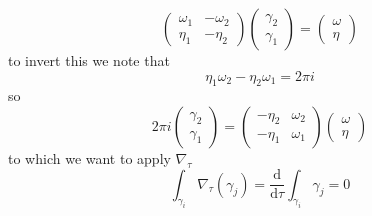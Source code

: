 \begin{frame}
    $$
    \left(\begin{array}{cc}
            \omega_{1} & -\omega_{2} \\
            \eta_{1} & -\eta_{2}
            \end{array}\right)\left(\begin{array}{l}
            \gamma_{2} \\
            \gamma_{1}
            \end{array}\right)=\left(\begin{array}{l}
            \omega \\
            \eta
    \end{array}\right)
    $$
    to invert this we note that
    $$
    \eta_{1} \omega_{2}-\eta_{2} \omega_{1}=2 \pi i
    $$
    so
    $$
    2 \pi i\left(\begin{array}{l}
            \gamma_{2} \\
            \gamma_{1}
            \end{array}\right)=\left(\begin{array}{ll}
            -\eta_{2} & \omega_{2} \\
            -\eta_{1} & \omega_{1}
            \end{array}\right)\left(\begin{array}{l}
            \omega \\
            \eta
    \end{array}\right)
    $$
    to which we want to apply $\nabla_\tau$
    $$
    \int_{{\gamma}_{{i}}} \nabla_{{\tau}}(\gamma_j)=\frac{\mathrm{d}}{\mathrm{d} \tau} \int_{\gamma_{{i}}}\gamma_j = 0
    $$
\end{frame}


